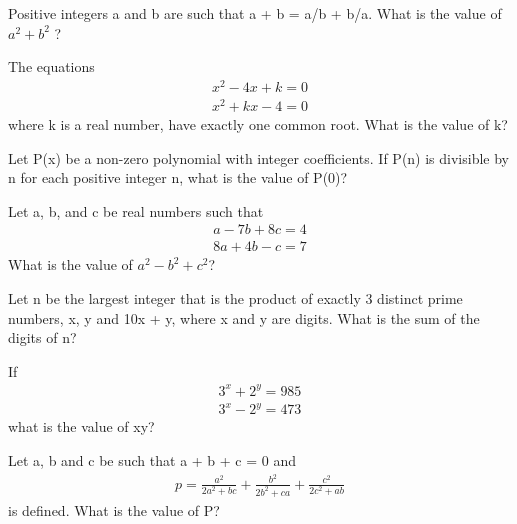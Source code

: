 \item Positive integers a and b are such that a + b = a/b + b/a. What is the value of $a^{2} + b^{2}$ ?

\item The equations 
\begin{align}
x^{2} - 4x + k = 0
\end{align}
\begin{align} 
x^{2} + kx - 4 = 0
\end{align}
where k is a real number, have exactly one common root. What is the value of k?

\item Let P(x) be a non-zero polynomial with integer coefficients. If P(n) is divisible by n for each positive integer n, what is the value of P(0)?

\item Let a, b, and c be real numbers such that
\begin{align*} 
a - 7b + 8c = 4 
\end{align*}
\begin{align*}
8a + 4b - c = 7
\end{align*} 
What is the value of $a^{2} - b^{2} + c^{2}$?

\item Let n be the largest integer that is the product of exactly 3 distinct prime numbers, x, y and 10x + y, where x and y are digits. What is the sum of the digits of n?

\item If
\begin{align} 
3^{x} + 2^{y} = 985
\end{align}
\begin{align} 
3^{x} - 2^{y} = 473
\end{align} 
what is the value of xy?

\item Let a, b and c be such that a + b + c = 0 and
\begin{align*}
p = \frac{a^{2}}{2a^{2} + bc} + \frac{b^{2}}{2b^{2} + ca} + \frac{c^{2}}{2c^{2} + ab}
\end{align*}
is defined. What is the value of P?
